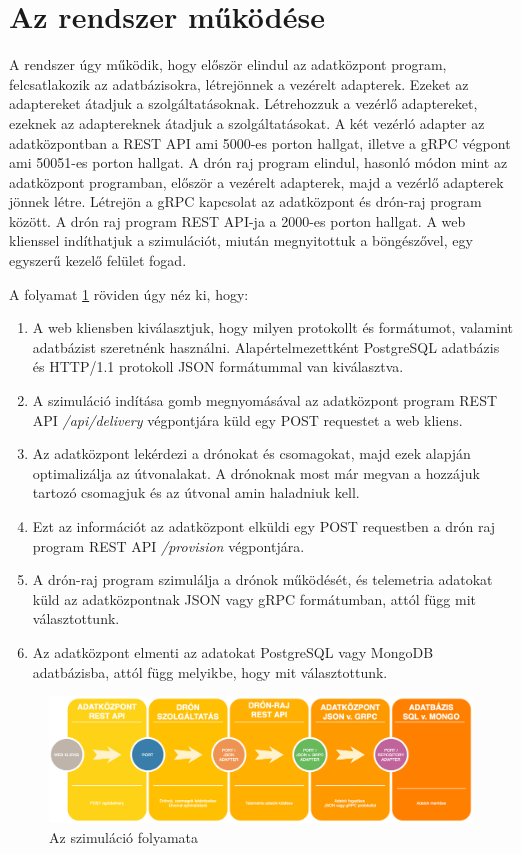 \section{Az rendszer működése}

A rendszer úgy működik, hogy először elindul az adatközpont program, felcsatlakozik az adatbázisokra, létrejönnek a vezérelt adapterek.
Ezeket az adaptereket átadjuk a szolgáltatásoknak. Létrehozzuk a vezérlő adaptereket, ezeknek az adaptereknek átadjuk a szolgáltatásokat.
A két vezérló adapter az adatközpontban a REST API ami 5000-es porton hallgat, illetve a gRPC végpont ami 50051-es porton hallgat.
A drón raj program elindul, hasonló módon mint az adatközpont programban, először a vezérelt adapterek, majd a vezérlő adapterek jönnek létre.
Létrejön a gRPC kapcsolat az adatközpont és drón-raj program között.
A drón raj program REST API-ja a 2000-es porton hallgat.
A web klienssel indíthatjuk a szimulációt, miután megnyitottuk a böngészővel, egy egyszerű kezelő felület fogad.

A folyamat \ref{fig:mukodes} röviden úgy néz ki, hogy:
\begin{enumerate}
    \item A web kliensben kiválasztjuk, hogy milyen protokollt és formátumot, valamint adatbázist szeretnénk használni. Alapértelmezettként PostgreSQL adatbázis és HTTP/1.1 protokoll JSON formátummal van kiválasztva.
    \item A szimuláció indítása gomb megnyomásával az adatközpont program REST API \textit{/api/delivery} végpontjára küld egy POST requestet a web kliens.
    \item Az adatközpont lekérdezi a drónokat és csomagokat, majd ezek alapján optimalizálja az útvonalakat.
        A drónoknak most már megvan a hozzájuk tartozó csomagjuk és az útvonal amin haladniuk kell.
    \item Ezt az információt az adatközpont elküldi egy POST requestben a drón raj program REST API \textit{/provision} végpontjára.
    \item A drón-raj program szimulálja a drónok működését, és telemetria adatokat küld az adatközpontnak JSON vagy gRPC formátumban, attól függ mit választottunk.
    \item Az adatközpont elmenti az adatokat PostgreSQL vagy MongoDB adatbázisba, attól függ melyikbe, hogy mit választottunk.
\end{enumerate}

\begin{figure}[h]
    \centering
    \includegraphics[scale=0.3]{images/mukodes}
    \caption{Az szimuláció folyamata}
    \label{fig:mukodes}
\end{figure}



